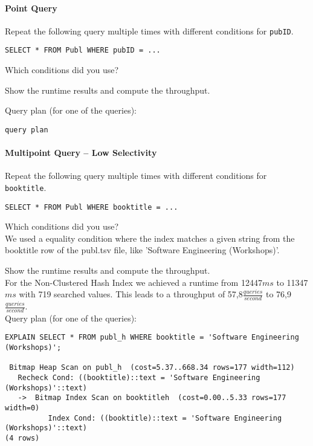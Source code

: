 \documentclass[11pt]{scrartcl}
\begin{document}
\paragraph{Point Query}

Repeat the following query multiple times with different conditions for {\tt pubID}.

{\small
\begin{verbatim}
SELECT * FROM Publ WHERE pubID = ...
\end{verbatim}
}

\noindent
Which conditions did you use?

\smallskip\noindent
Show the runtime results and compute the throughput.

\smallskip\noindent
Query plan (for one of the queries):
{\small
\begin{verbatim}
query plan
\end{verbatim}
}


\paragraph{Multipoint Query -- Low Selectivity}

Repeat the following query multiple times with different conditions for {\tt booktitle}.

{\small
\begin{verbatim}
SELECT * FROM Publ WHERE booktitle = ...
\end{verbatim}
}

\noindent
Which conditions did you use?\\
We used a equality condition where the index matches a given string from the booktitle row of the publ.tsv file, like 'Software Engineering (Workshops)'.

\smallskip\noindent
Show the runtime results and compute the throughput.\\
For the Non-Clustered Hash Index we achieved a runtime from 12447$ms$ to 11347$ms$ with 719 searched values.
This leads to a throughput of 57,8$\frac{queries}{second}$ to 76,9$\frac{queries}{second}$.\\

\smallskip\noindent
Query plan (for one of the queries):
\begin{verbatim}
EXPLAIN SELECT * FROM publ_h WHERE booktitle = 'Software Engineering (Workshops)';

 Bitmap Heap Scan on publ_h  (cost=5.37..668.34 rows=177 width=112)
   Recheck Cond: ((booktitle)::text = 'Software Engineering (Workshops)'::text)
   ->  Bitmap Index Scan on booktitleh  (cost=0.00..5.33 rows=177 width=0)
          Index Cond: ((booktitle)::text = 'Software Engineering (Workshops)'::text)
(4 rows)
\end{verbatim}
\end{document}
